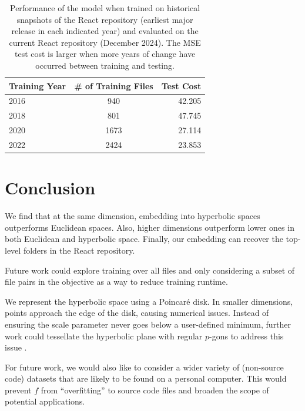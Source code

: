 \documentclass{article}
\begin{document}
\begin{table}[H]
  \centering
  \begin{tabular}{lcr}
    \toprule
    \textbf{Training Year} & \textbf{\# of Training Files} & \textbf{Test Cost} \\
    \midrule
    2016                   & 940                           & 42.205             \\
    2018                   & 801                           & 47.745             \\
    2020                   & 1673                          & 27.114             \\
    2022                   & 2424                          & 23.853             \\
    \bottomrule
  \end{tabular}
  \caption{Performance of the model when trained on historical snapshots of the React repository (earliest major release in each indicated year) and evaluated on the current React repository (December 2024). The MSE test cost is larger when more years of change have occurred between training and testing.}
  \label{tab:historical-transfer}
\end{table}

\section{Conclusion}
We find that at the same dimension, embedding into hyperbolic spaces outperforms Euclidean spaces. Also, higher dimensions outperform lower ones in both Euclidean and hyperbolic space. Finally, our embedding can recover the top-level folders in the React repository.

Future work could explore training over all files and only considering a subset of file pairs in the objective as a way to reduce training runtime.

We represent the hyperbolic space using a Poincaré disk. In smaller dimensions, points approach the edge of the disk, causing numerical issues. Instead of ensuring the scale parameter never goes below a user-defined minimum, further work could tessellate the hyperbolic plane with regular $p$-gons to address this issue \cite{celinska2024numerical}.

For future work, we would also like to consider a wider variety of (non-source code) datasets that are likely to be found on a personal computer. This would prevent $f$ from “overfitting” to source code files and broaden the scope of potential applications.


\printbibliography
\end{document}
